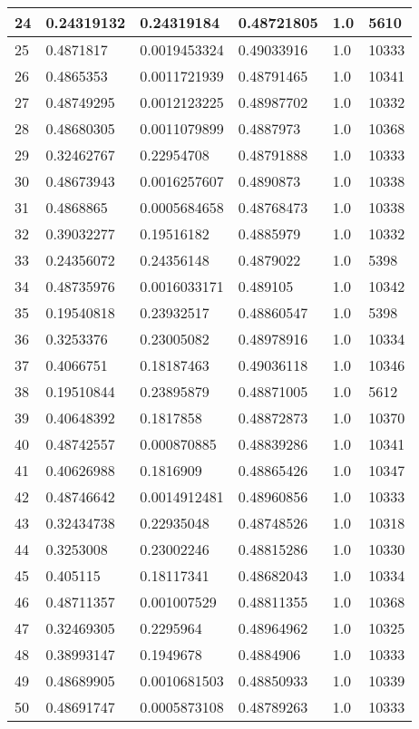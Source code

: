 \begin{longtable}{|l|l|l|l|l|l|}
24 & 0.24319132 & 0.24319184 & 0.48721805 & 1.0 & 5610 \\ \hline 
25 & 0.4871817 & 0.0019453324 & 0.49033916 & 1.0 & 10333 \\ \hline 
26 & 0.4865353 & 0.0011721939 & 0.48791465 & 1.0 & 10341 \\ \hline 
27 & 0.48749295 & 0.0012123225 & 0.48987702 & 1.0 & 10332 \\ \hline 
28 & 0.48680305 & 0.0011079899 & 0.4887973 & 1.0 & 10368 \\ \hline 
29 & 0.32462767 & 0.22954708 & 0.48791888 & 1.0 & 10333 \\ \hline 
30 & 0.48673943 & 0.0016257607 & 0.4890873 & 1.0 & 10338 \\ \hline 
31 & 0.4868865 & 0.0005684658 & 0.48768473 & 1.0 & 10338 \\ \hline 
32 & 0.39032277 & 0.19516182 & 0.4885979 & 1.0 & 10332 \\ \hline 
33 & 0.24356072 & 0.24356148 & 0.4879022 & 1.0 & 5398 \\ \hline 
34 & 0.48735976 & 0.0016033171 & 0.489105 & 1.0 & 10342 \\ \hline 
35 & 0.19540818 & 0.23932517 & 0.48860547 & 1.0 & 5398 \\ \hline 
36 & 0.3253376 & 0.23005082 & 0.48978916 & 1.0 & 10334 \\ \hline 
37 & 0.4066751 & 0.18187463 & 0.49036118 & 1.0 & 10346 \\ \hline 
38 & 0.19510844 & 0.23895879 & 0.48871005 & 1.0 & 5612 \\ \hline 
39 & 0.40648392 & 0.1817858 & 0.48872873 & 1.0 & 10370 \\ \hline 
40 & 0.48742557 & 0.000870885 & 0.48839286 & 1.0 & 10341 \\ \hline 
41 & 0.40626988 & 0.1816909 & 0.48865426 & 1.0 & 10347 \\ \hline 
42 & 0.48746642 & 0.0014912481 & 0.48960856 & 1.0 & 10333 \\ \hline 
43 & 0.32434738 & 0.22935048 & 0.48748526 & 1.0 & 10318 \\ \hline 
44 & 0.3253008 & 0.23002246 & 0.48815286 & 1.0 & 10330 \\ \hline 
45 & 0.405115 & 0.18117341 & 0.48682043 & 1.0 & 10334 \\ \hline 
46 & 0.48711357 & 0.001007529 & 0.48811355 & 1.0 & 10368 \\ \hline 
47 & 0.32469305 & 0.2295964 & 0.48964962 & 1.0 & 10325 \\ \hline 
48 & 0.38993147 & 0.1949678 & 0.4884906 & 1.0 & 10333 \\ \hline 
49 & 0.48689905 & 0.0010681503 & 0.48850933 & 1.0 & 10339 \\ \hline 
50 & 0.48691747 & 0.0005873108 & 0.48789263 & 1.0 & 10333 \\ \hline 
\end{longtable}
